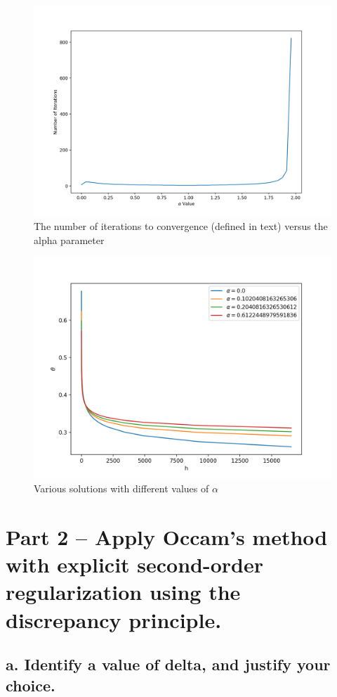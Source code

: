 \documentclass{article}
\begin{document}
\begin{figure}[ht!]
    \centering
    \includegraphics[width=4.5in]{Iterations_Alphas.png}
    \caption{The number of iterations to convergence (defined in text) versus the alpha parameter}
    \label{fig:iterations}
\end{figure}


\begin{figure}[ht!]
    \centering
    \includegraphics[width=4.5in]{alphas_range_plot.png}
    \caption{Various solutions with different values of $\alpha$}
    \label{fig:solutions}
\end{figure}
\FloatBarrier
\section*{Part 2 -- Apply Occam's method with explicit second-order regularization using the discrepancy principle.}
\subsection*{a. Identify a value of delta, and justify your choice.}
\end{document}
